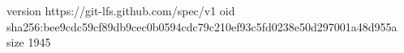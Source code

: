 version https://git-lfs.github.com/spec/v1
oid sha256:bee9cdc59cf89db9cec0b0594cdc79c210ef93c5fd0238e50d297001a48d955a
size 1945
